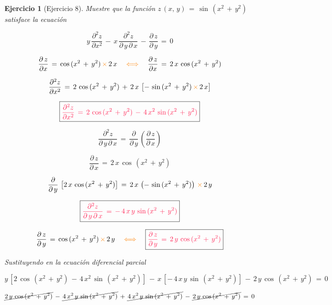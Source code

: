 \documentclass[a4paper,11pt]{book}
\newtheorem{ejer}{Ejercicio}[section]
\begin{document}
\begin{ejer}[Ejercicio 8] 

  Muestre que la función $z\,(x,\,y)\,=\,\sin\,(x^{2}\,+\,y^{2})$ satisface la ecuación 

$$y\,\dfrac{\partial^2{z}}{\partial{x}^{2}}\,-\,x\,\dfrac{\partial^2{z}}{\partial\,y\,\partial\,x}\,-\,\dfrac{\partial\,z}{\partial\,y}\,=\,0$$ 

$$\dfrac{\partial\,z}{\partial{x}}\,=\,\cos\,(x^{2}\,+\,y^{2})\,\textcolor{orange}{\times}\,2\,x \quad \textcolor{orange}{\iff} \quad \dfrac{\partial\,z}{\partial{x}}\,=\,2\,x\,\cos\,(x^{2}\,+\,y^{2})$$ 

$$\dfrac{\partial^2{z}}{\partial{x}^{2}}\,=\,2\,\cos\,(x^{2}\,+\,y^{2})\,+\,2\,x\,\left[-\,\sin\,(x^{2}\,+\,y^{2})\,\textcolor{orange}{\times}\,2\,x \right]$$ 


$$\boxed{\textcolor{awesome}{\dfrac{\partial^2{z}}{\partial{x}^{2}}\,=\,2\,\cos\,(x^{2}\,+\,y^{2})\,-\,4\,x^{2}\,\sin\,(x^{2}\,+\,y^{2})}}$$ 

$$\dfrac{\partial^2{z}}{\partial\,y\,\partial\,x}\,=\,\dfrac{\partial}{\partial\,y}\,\left(\dfrac{\partial\,z}{\partial\,x} \right)$$ 

$$\dfrac{\partial\,z}{\partial\,x}\,=\,2\,x\,\cos\,(x^{2}\,+\,y^{2})$$ 

$$\dfrac{\partial}{\partial\,y}\,\left[2\,x\,\cos\,(x^{2}\,+\,y^{2}) \right]\,=\,2\,x\,\left(-\,\sin\,(x^{2}\,+\,y^{2}) \right)\,\textcolor{orange}{\times}\,2\,y$$ 

$$\boxed{\textcolor{awesome}{\dfrac{\partial^2{z}}{\partial\,y\,\partial\,x}\,=\,-\,4\,x\,y\,\sin\,(x^{2}\,+\,y^{2}) } } $$ 

$$\dfrac{\partial\,z}{\partial\,y}\,=\,\cos\,(x^{2}\,+\,y^{2})\,\textcolor{orange}{\times}\,2\,y \quad \textcolor{orange}{\iff} \quad \boxed{\textcolor{awesome}{\dfrac{\partial\,z}{\partial\,y}\,=\,2\,y\,\cos\,(x^{2}\,+\,y^{2}) } }$$ 

Sustituyendo en la ecuación diferencial parcial  

$$y\,\left[2\,\cos\,(x^{2}\,+\,y^{2})\,-\,4\,x^{2}\,\sin\,(x^{2}\,+\,y^{2}) \right]\,-\,x\,\left[-\,4\,x\,y\,\sin\,(x^{2}\,+\,y^{2}) \right]\,-\,2\,y\,\cos\,(x^{2}\,+\,y^{2})\,=\,0 $$ 

$$\cancel{2\,y\,\cos\,(x^{2}\,+\,y^{2})}\,-\,\cancel{4\,x^{2}\,y\,\sin\,(x^{2}\,+\,y^{2})}\,+\,\cancel{4\,x^{2}\,y\,\sin\,(x^{2}\,+\,y^{2})}\,-\,\cancel{2\,y\,\cos\,(x^{2}\,+\,y^{2})}\,=\,0$$ 

\begin{center} 


\end{center} 

\end{ejer} 
\end{document}
